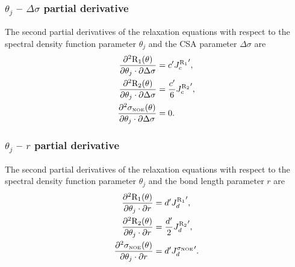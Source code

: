 \subsubsection{$\theta_j$ -- $\Delta\sigma$ partial derivative}

The second partial derivatives of the relaxation equations with respect to the spectral density function parameter $\theta_j$ and the CSA parameter $\Delta\sigma$ are
\begin{subequations}
\begin{align}
    \frac{\partial^2 \mathrm{R}_1(\theta)}{\partial \theta_j \cdot \partial \Delta\sigma} &= c' {J_c^{\mathrm{R}_1}}',            \label{eq: Ri': d2R1/dmfj.dCSA} \\
    \frac{\partial^2 \mathrm{R}_2(\theta)}{\partial \theta_j \cdot \partial \Delta\sigma} &= \frac{c'}{6} {J_c^{\mathrm{R}_2}}',  \label{eq: Ri': d2R2/dmfj.dCSA} \\
    \frac{\partial^2 \sigma_{\scriptscriptstyle \mathrm{NOE}}(\theta)}{\partial \theta_j \cdot \partial \Delta\sigma} &= 0.                   \label{eq: Ri': d2sigmaNOE/dmfj.dCSA}
\end{align}
\end{subequations}


\subsubsection{$\theta_j$ -- $r$ partial derivative}

The second partial derivatives of the relaxation equations with respect to the spectral density function parameter $\theta_j$ and the bond length parameter $r$ are
\begin{subequations}
\begin{align}
    \frac{\partial^2 \mathrm{R}_1(\theta)}{\partial \theta_j \cdot \partial r} &= d' {J_d^{\mathrm{R}_1}}',               \label{eq: Ri': d2R1/dmfj.dr} \\
    \frac{\partial^2 \mathrm{R}_2(\theta)}{\partial \theta_j \cdot \partial r} &= \frac{d'}{2} {J_d^{\mathrm{R}_2}}',     \label{eq: Ri': d2R2/dmfj.dr} \\
    \frac{\partial^2 \sigma_{\scriptscriptstyle \mathrm{NOE}}(\theta)}{\partial \theta_j \cdot \partial r} &= d' {J_d^{\sigma_{\scriptscriptstyle \mathrm{NOE}}}}'. \label{eq: Ri': d2sigmaNOE/dmfj.dr}
\end{align}
\end{subequations}


